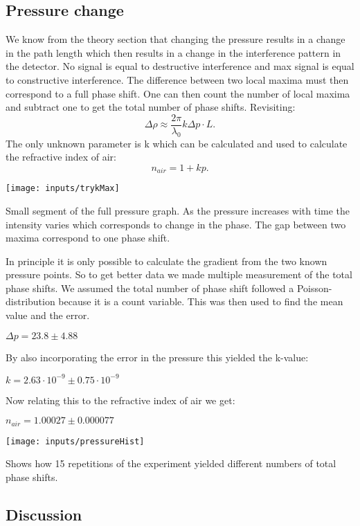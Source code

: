 \documentclass[working, oneside]{inputs/tuftebook}
\begin{document}
\subsection*{Pressure change} 
We know from the theory section that changing the pressure results in a change in the path length which then results in a change in the interference pattern in the detector. No signal is equal to destructive interference and max signal is equal to constructive interference. The difference between two local maxima must then correspond to a full phase shift. One can then count the number of local maxima and subtract one to get the total number of phase shifts. Revisiting:
\[
\Delta \rho \approx \frac{2\pi}{\lambda_0}k\Delta p\cdot L
.\] 
The only unknown parameter is k which can be calculated and used to calculate the refractive index of air:
\[
n_{air} = 1 + k p
.\] 
\begin{marginfigure}
	\centering
	\texttt{[image: inputs/trykMax]}
	\caption{Small segment of the full pressure graph. As the pressure increases with time the intensity varies which corresponds to change in the phase. The gap between two maxima correspond to one phase shift.}
\end{marginfigure}
In principle it is only possible to calculate the gradient from the two known pressure points. So to get better data we made multiple measurement of the total phase shifts. We assumed the total number of phase shift followed a Poisson-distribution because it is a count variable. This was then used to find the mean value and the error. 
\begin{center}
$\Delta p = 23.8 \pm 4.88$
\end{center}
By also incorporating the error in the pressure this  yielded the k-value:
\begin{center}
$k=2.63 \cdot 10^{-9} \pm 0.75 \cdot 10^{-9}$
\end{center}
Now relating this to the refractive index of air we get:
\begin{center}
$n_{air} = 1.00027 \pm 0.000077$
\end{center}

\begin{marginfigure}
	\centering
	\texttt{[image: inputs/pressureHist]}
	\caption{Shows how 15 repetitions of the experiment yielded different numbers of total phase shifts. }
\end{marginfigure}

\subsection*{Discussion}
\end{document}
